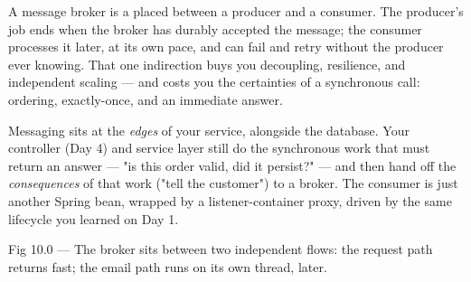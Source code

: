 \begin{keyidea}
A message broker is a  placed between a producer and a consumer. The producer's job ends when the broker has durably accepted the message; the consumer processes it later, at its own pace, and can fail and retry without the producer ever knowing. That one indirection buys you decoupling, resilience, and independent scaling --- and costs you the certainties of a synchronous call: ordering, exactly-once, and an immediate answer.
\end{keyidea}

 Messaging sits at the \emph{edges} of your service, alongside the database. Your controller (Day 4) and service layer still do the synchronous work that must return an answer --- "is this order valid, did it persist?" --- and then hand off the \emph{consequences} of that work ("tell the customer") to a broker. The consumer is just another Spring bean, wrapped by a listener-container proxy, driven by the same lifecycle you learned on Day 1.

\begin{wbfigure}{Fig 10.0 --- The broker sits between two independent flows: the request path returns fast; the email path runs on its own thread, later.}
\end{wbfigure}

